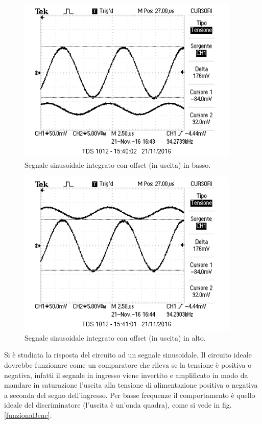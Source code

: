\documentclass[10pt,a4paper]{article}
\begin{document}
\begin{figure}[htb!]
\centering
\includegraphics[scale=1.0]{immagini/sinusoidaleinBasso.png}
\caption{Segnale sinusoidale integrato con offset (in uscita) in basso.}
\label{senoBasso}
\end{figure}

\begin{figure}[htb!]
\centering
\includegraphics[scale=1.0]{immagini/sinusoidaleinAlto.png}
\caption{Segnale sinusoidale integrato con offset (in uscita) in alto.}
\label{senoAlto}
\end{figure}

Si è studiata la risposta del circuito ad un segnale sinusoidale. Il circuito ideale dovrebbe funzionare come un comparatore che rileva se la tensione è positiva o negativa, infatti il segnale in ingresso viene invertito e amplificato in modo da mandare in saturazione l'uscita alla tensione di alimentazione  positiva o negativa a seconda del segno dell'ingresso. Per basse frequenze il comportamento è quello ideale del discriminatore (l'uscita è un'onda quadra), come si vede in fig.\ref{funzionaBene}.
\end{document}
